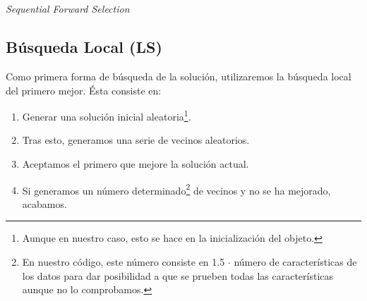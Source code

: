 \documentclass[a4paper, 11pt]{article}
\begin{document}
			\begin{algorithm}[H]
				\begin{algorithmic}[1]
					\REQUIRE \ \\
							 \

							\ENDIF
							
							\ENDIF
						\ENDFOR
						
						\ELSE
						\ENDIF
					\ENDWHILE
				\end{algorithmic}
			\caption{\textit{Sequential Forward Selection}}
			\label{SFS}
			\end{algorithm}			

		\subsection{Búsqueda Local (\textbf{LS})}
			Como primera forma de búsqueda de la solución, utilizaremos la búsqueda local del primero
			mejor. Ésta consiste en:
				\begin{enumerate}
					\item Generar una solución inicial aleatoria\footnote{Aunque en nuestro caso, esto
					se hace en la inicialización del objeto.}.
					\item Tras esto, generamos una serie de vecinos aleatorios.
					\item Aceptamos el primero que mejore la solución actual.
					\item Si generamos un número determinado\footnote{En nuestro código, este número
					consiste en 1.5 $\cdot$ número de características de los datos para dar posibilidad
					a que se prueben todas las características aunque no lo comprobamos.} de vecinos y
					no se ha mejorado, acabamos.
				\end{enumerate}
\end{document}

